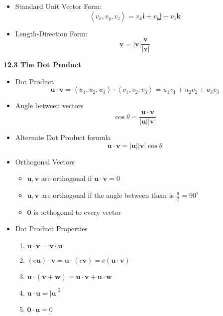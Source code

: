 \documentclass[12pt]{article}
\renewcommand{\vec}[1]{\mathbf{#1}}
\newcommand{\veci}{\mathbf{i}}
\newcommand{\vecj}{\mathbf{j}}
\newcommand{\veck}{\mathbf{k}}
\newcommand{\<}{\left<}
\renewcommand{\>}{\right>}
\begin{document}
\begin{itemize}
\begin{itemize}
\begin{itemize}
    \item Standard Unit Vector Form:
      \[\<v_x,v_y,v_z\> = v_x\veci + v_y\vecj + v_z\veck\]

    \item Length-Direction Form:
      \[\vec{v} = |\vec{v}|\frac{\vec{v}}{|\vec{v}|}\]

    \end{itemize}
  \end{itemize}
\end{itemize}

\newpage
  
\centerline{\bf 12.3 The Dot Product}
  
    \begin{itemize}
    \item Dot Product
      \[ \vec{u} \cdot \vec{v} = \<u_1,u_2,u_3\>\cdot\<v_1,v_2,v_3\> = u_1v_1 + u_2v_2 + u_3v_3 \]
  
    \item Angle between vectors
      \[\cos\theta = \frac{\vec{u}\cdot\vec{v}}{|\vec{u}||\vec{v}|}\] 
      
    \item Alternate Dot Product formula
      \[\vec{u} \cdot \vec{v} = |\vec{u}||\vec{v}|\cos \theta \]
      
    \item Orthogonal Vectors
      \begin{itemize}
      \item  $\vec{u},\vec{v}$ are orthogonal if $\vec{u} \cdot \vec{v} = 0$
      \item $\vec{u},\vec{v}$ are orthogonal if the angle between them is $\frac{\pi}{2} = 90^\circ$
      \item $\vec{0}$ is orthogonal to every vector
      \end{itemize}
    
    \item Dot Product Properties
      \begin{enumerate}
      \item $\vec{u} \cdot \vec{v} = \vec{v}\cdot\vec{u}$
      \item $(c\vec{u})\cdot \vec{v} = \vec{u} \cdot (c\vec{v}) = c(\vec{u} \cdot \vec{v})$
      \item $\vec{u} \cdot (\vec{v} + \vec{w}) = \vec{u}\cdot\vec{v} + \vec{u}\cdot \vec{w}$
      \item $\vec{u} \cdot \vec{u} = |\vec{u}|^2$
      \item $\vec{0} \cdot \vec{u} = 0$
      \end{enumerate}
    

\end{itemize}
\end{document}
